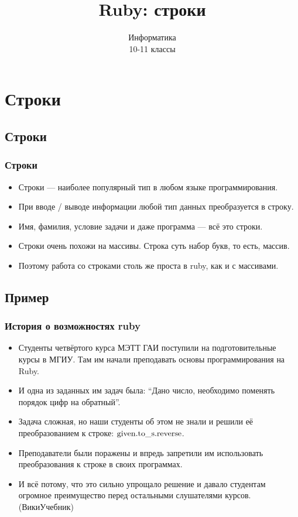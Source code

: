 \documentclass[compress,red]{beamer}
\title{Ruby: строки}
\author{Информатика \\ 10-11 классы}
\begin{document}
\maketitle

\section{Строки}

\subsection{Строки}
\begin{frame}
  \frametitle{Строки}
  \begin{itemize}
    \item Строки --- наиболее популярный тип в любом языке программирования.
    \item При вводе / выводе информации любой тип данных преобразуется в строку.
    \item Имя, фамилия, условие задачи и даже программа --- всё это строки.
    \item Строки очень похожи на массивы. Строка суть набор букв, то есть, массив.
    \item Поэтому работа со строками столь же проста в ruby, как и с массивами.
  \end{itemize}
\end{frame}

\subsection{Пример}
\begin{frame}
  \frametitle{История о возможностях ruby}
  \begin{itemize}
    \item Студенты четвёртого курса МЭТТ ГАИ поступили на подготовительные курсы в МГИУ. Там им начали преподавать основы программирования на Ruby. 
    \item И одна из заданных им задач была: ``Дано число, необходимо поменять порядок цифр на обратный''. 
    \item Задача сложная, но наши студенты об этом не знали и решили её преобразованием к строке: $\rm{given.to\_s.reverse}$. 
    \item Преподаватели были поражены и впредь запретили им использовать преобразования к строке в своих программах.
    \item И всё потому, что это сильно упрощало решение и давало студентам огромное преимущество перед остальными слушателями курсов. (ВикиУчебник)
  \end{itemize}
\end{frame}
\end{document}
